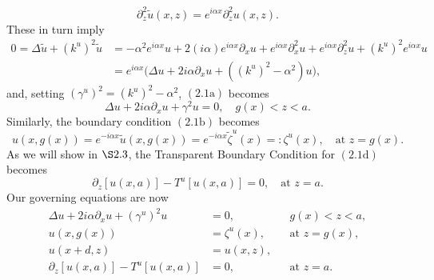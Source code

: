 \begin{equation*}\partial_z^2 \tilde{u}(x,z) = e^{i\alpha x}\partial_z^2 u(x,z).\end{equation*}
These in turn imply
\begin{align*}0=\Delta \tilde{u} + (k^u)^2\tilde{u} &= -\alpha^2e^{i\alpha x}u+2(i\alpha)e^{i\alpha x}\partial_xu+e^{i\alpha x}\partial_x^2u+e^{i\alpha x}\partial_z^2u+(k^u)^2e^{i\alpha x}u\\&=
e^{i\alpha x}\big(\Delta u +2i\alpha\partial_xu+\left((k^u)^2-\alpha^2\right)u\big),
\end{align*}
and, setting $(\gamma^u)^2 = (k^u)^2-\alpha^2$, $(2.1\text{a})$ becomes
\begin{equation}\Delta u +2i\alpha\partial_xu+\gamma^2u=0,\quad \text{$g(x)<z<a$}. \end{equation}
Similarly, the boundary condition $(2.1\text{b})$ becomes
$$u(x,g(x))=e^{-i\alpha x}\tilde{u}(x,g(x))=e^{-i\alpha x}\tilde{\zeta}^u(x)=:\zeta^u(x),\quad \text{at $z=g(x)$}.$$
As we will show in $\S 2.3$, the Transparent Boundary Condition for $(2.1\text{d})$ becomes
\begin{equation}\partial_z \left[u(x,a)\right] - T^u[u(x,a)]=0,\quad \text{at $z=a$}. \end{equation}
Our governing equations are now
\begin{subequations}
\begin{align}
\Delta u +2i\alpha\partial_xu+(\gamma^u)^2u&=0,&& \text{$g(x)<z<a$},\\
u(x,g(x))&={\zeta}^u(x),&& \text{at $z=g(x)$},\\
u(x+d,z)&=u(x,z),\\
\partial_z \left[u(x,a)\right] - T^u[u(x,a)]&=0,&& \text{at $z=a$}. 
\end{align}
\end{subequations}